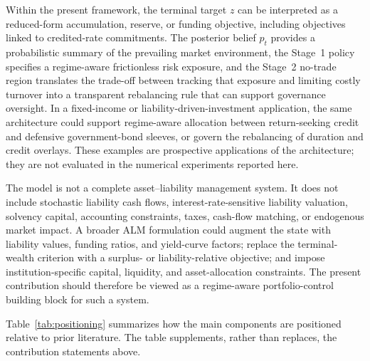 \documentclass[a4paper,10pt]{article}
\begin{document}
Within the present framework, the terminal target \(z\) can be interpreted
as a reduced-form accumulation, reserve, or funding objective, including objectives linked to credited-rate
commitments. The posterior belief \(p_t\) provides a probabilistic summary of the
prevailing market environment, the Stage~1 policy specifies a
regime-aware frictionless risk exposure, and the Stage~2 no-trade region
translates the trade-off between tracking that exposure and limiting costly
turnover into a transparent rebalancing rule that can support governance
oversight. In a fixed-income or
liability-driven-investment application, the same architecture could support
regime-aware allocation between return-seeking credit and defensive
government-bond sleeves, or govern the rebalancing of duration and credit
overlays. These examples are prospective applications of the architecture;
they are not evaluated in the numerical experiments reported here.

The model is not a complete asset--liability management system. It does not
include stochastic liability cash flows, interest-rate-sensitive liability
valuation, solvency capital, accounting constraints, taxes, cash-flow
matching, or endogenous market impact. A broader ALM formulation could
augment the state with liability values, funding ratios, and yield-curve
factors; replace the terminal-wealth criterion with a surplus- or
liability-relative objective; and impose institution-specific capital,
liquidity, and asset-allocation constraints. The present contribution should
therefore be viewed as a regime-aware portfolio-control building block for
such a system.

Table~\ref{tab:positioning} summarizes how the main components are positioned relative to prior literature. The table supplements, rather than replaces, the contribution statements above.
\end{document}
